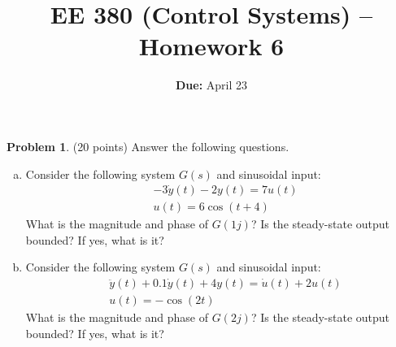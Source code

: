 \documentclass{article}
\theoremstyle{definition}
\newtheorem{problem}{Problem}
\begin{document}
\title{EE 380 (Control Systems) -- Homework 6}
\author{{\bf Due:} April 23}
\date{}

\maketitle


\begin{problem}(20 points)
Answer the following questions.

\begin{enumerate}[(a)]
\item Consider the following system $G(s)$ and sinusoidal input:
\begin{align*}
  & -3\dot{y}(t) - 2y(t) = 7 u(t) \\
  & u(t) = 6\cos(t+4)
\end{align*}
What is the magnitude and phase of $G(1j)$?  Is the steady-state
output bounded?  If yes, what is it?

\item Consider the following system $G(s)$ and sinusoidal input:
\begin{align*}
  & \ddot{y}(t) + 0.1\dot{y}(t) + 4y(t) = \dot{u}(t) + 2 u(t) \\
  & u(t) = -\cos(2t)
\end{align*}
What is the magnitude and phase of $G(2j)$?  Is the steady-state
output bounded?  If yes, what is it?

\end{enumerate}
\end{problem}


\end{document}
